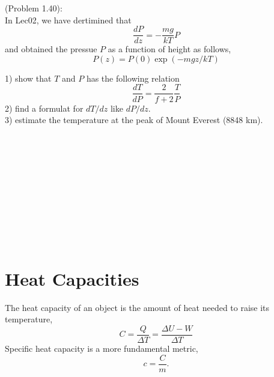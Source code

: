 \documentclass[twoside]{article}
\begin{document}
(Problem 1.40):\\
In Lec02, we have dertimined that 
  \begin{equation} \frac{dP}{dz} = -\frac{mg}{kT} P \end{equation}
and obtained the pressue $P$ as a function of height as follows,
  \begin{equation} P(z) = P(0) \exp(-mgz/kT) \end{equation}

1) show that $T$ and $P$ has the following relation
  \begin{equation} \frac{dT}{dP} = \frac{2}{f+2} \frac{T}{P} \end{equation}
2) find a formulat for $dT/dz$ like $dP/dz$.\\
3) estimate the temperature at the peak of Mount Everest (8848 km).\\\\\\\\\\\\\\\\\\\\\

\section{Heat Capacities}
The heat capacity of an object is the amount of heat needed to raise its temperature,
  \begin{equation} C = \frac{Q}{\Delta{T}} = \frac{\Delta{U}-W}{\Delta{T}}\end{equation}
Specific heat capacity is a more fundamental metric,
  \begin{equation} c = \frac{C}{m}. \end{equation}
\end{document}
